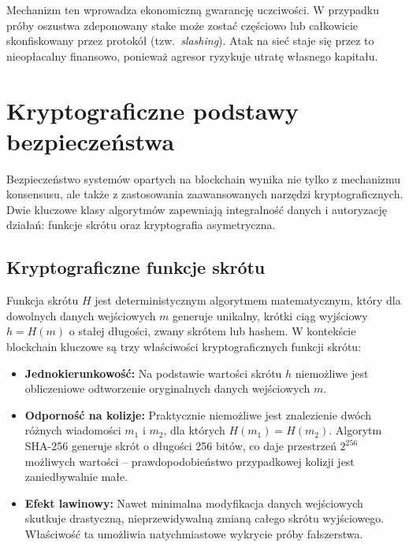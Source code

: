 \documentclass[12pt,a4paper,twoside]{report}
\begin{document}
Mechanizm ten wprowadza ekonomiczną gwarancję uczciwości. W przypadku próby oszustwa
zdeponowany stake może zostać częściowo lub całkowicie skonfiskowany przez protokół
(tzw.~\textit{slashing}). Atak na sieć staje się przez to nieopłacalny finansowo,
ponieważ agresor ryzykuje utratę własnego kapitału.

\section{Kryptograficzne podstawy bezpieczeństwa}

Bezpieczeństwo systemów opartych na blockchain wynika nie tylko z mechanizmu konsensusu,
ale także z zastosowania zaawansowanych narzędzi kryptograficznych. Dwie kluczowe klasy
algorytmów zapewniają integralność danych i autoryzację działań: funkcje skrótu oraz
kryptografia asymetryczna.

\subsection{Kryptograficzne funkcje skrótu}

Funkcja skrótu \( H \) jest deterministycznym algorytmem matematycznym, który dla
dowolnych danych wejściowych \( m \) generuje unikalny, krótki ciąg wyjściowy
\( h = H(m) \) o stałej długości, zwany skrótem lub hashem. W kontekście blockchain
kluczowe są trzy właściwości kryptograficznych funkcji skrótu:

\begin{itemize}
    \item \textbf{Jednokierunkowość:} Na podstawie wartości skrótu \( h \) niemożliwe
          jest obliczeniowe odtworzenie oryginalnych danych wejściowych \( m \).
    \item \textbf{Odporność na kolizje:} Praktycznie niemożliwe jest znalezienie dwóch
          różnych wiadomości \( m_1 \) i \( m_2 \), dla których \( H(m_1) = H(m_2) \).
          Algorytm SHA-256 generuje skrót o długości 256 bitów, co daje przestrzeń
          \( 2^{256} \) możliwych wartości -- prawdopodobieństwo przypadkowej kolizji
          jest zaniedbywalnie małe.
    \item \textbf{Efekt lawinowy:} Nawet minimalna modyfikacja danych wejściowych
          skutkuje drastyczną, nieprzewidywalną zmianą całego skrótu wyjściowego.
          Właściwość ta umożliwia natychmiastowe wykrycie próby fałszerstwa.
\end{itemize}
\end{document}
